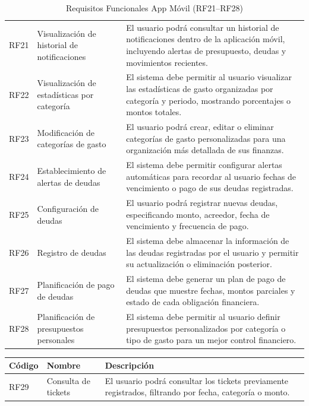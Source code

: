 \begin{itemize}
\begin{table}[H]
\begin{tabularx}{\textwidth}{@{} l l X @{}}
    RF21 & Visualización de historial de notificaciones &
    El usuario podrá consultar un historial de notificaciones dentro de la aplicación móvil, incluyendo alertas de presupuesto, deudas y movimientos recientes. \\

    RF22 & Visualización de estadísticas por categoría &
    El sistema debe permitir al usuario visualizar las estadísticas de gasto organizadas por categoría y periodo, mostrando porcentajes o montos totales. \\

    RF23 & Modificación de categorías de gasto &
    El usuario podrá crear, editar o eliminar categorías de gasto personalizadas para una organización más detallada de sus finanzas. \\

    RF24 & Establecimiento de alertas de deudas &
    El sistema debe permitir configurar alertas automáticas para recordar al usuario fechas de vencimiento o pago de sus deudas registradas. \\

    RF25 & Configuración de deudas &
    El usuario podrá registrar nuevas deudas, especificando monto, acreedor, fecha de vencimiento y frecuencia de pago. \\

    RF26 & Registro de deudas &
    El sistema debe almacenar la información de las deudas registradas por el usuario y permitir su actualización o eliminación posterior. \\

    RF27 & Planificación de pago de deudas &
    El sistema debe generar un plan de pago de deudas que muestre fechas, montos parciales y estado de cada obligación financiera. \\

    RF28 & Planificación de presupuestos personales &
    El sistema debe permitir al usuario definir presupuestos personalizados por categoría o tipo de gasto para un mejor control financiero. \\

    \bottomrule
    \end{tabularx}
    \caption{Requisitos Funcionales App Móvil (RF21–RF28)}
    \end{table}

    \begin{table}[H]
    \centering
    \renewcommand{\arraystretch}{1.2}
    \begin{tabularx}{\textwidth}{@{} l l X @{}}
    \toprule
    \textbf{Código} & \textbf{Nombre} & \textbf{Descripción} \\
    \midrule
    RF29 & Consulta de tickets &
    El usuario podrá consultar los tickets previamente registrados, filtrando por fecha, categoría o monto. \\


\end{tabularx}
\end{table}
\end{itemize}
